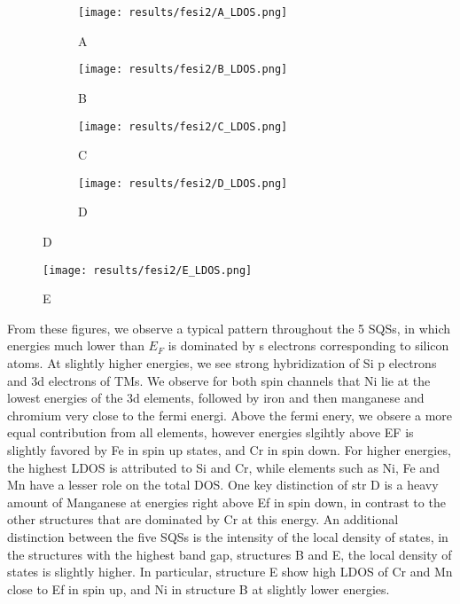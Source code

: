 \begin{figure}[H]
\centering
	\begin{subfigure}{\textwidth}
		\texttt{[image: results/fesi2/A\_LDOS.png]}
		\caption{A}
	\end{subfigure}
	\begin{subfigure}{\textwidth}
		\texttt{[image: results/fesi2/B\_LDOS.png]}
		\caption{B}
	\end{subfigure}
	\begin{subfigure}{\textwidth}
		\texttt{[image: results/fesi2/C\_LDOS.png]}
		\caption{C}
	\end{subfigure}
	\begin{subfigure}{\textwidth}
		\texttt{[image: results/fesi2/D\_LDOS.png]}
		\caption{D}
	\end{subfigure}
\end{figure}		
\begin{figure}[H]
	\centering	
	\texttt{[image: results/fesi2/E\_LDOS.png]}
	\caption{E}
\end{figure}

From these figures, we observe a typical pattern throughout the 5 SQSs, in which energies much lower than $E_F$ is dominated by s electrons corresponding to silicon atoms. At slightly higher energies, we see strong hybridization of Si p electrons and 3d electrons of TMs. We observe for both spin channels that Ni lie at the lowest energies of the 3d elements, followed by iron and then manganese and chromium very close to the fermi energi. Above the fermi enery, we obsere a more equal contribution from all elements, however energies slgihtly above EF is slightly favored by Fe in spin up states, and Cr in spin down. For higher energies, the highest LDOS is attributed to Si and Cr, while elements such as Ni, Fe and Mn have  a lesser role on the total DOS. One key distinction of str D is a heavy amount of Manganese at energies right above Ef in spin down, in contrast to the other structures that are dominated by Cr at this energy. An additional distinction between the five SQSs is the intensity of the local density of states, in the structures with the highest band gap, structures B and E, the local density of states is slightly higher. In particular, structure E show high LDOS of Cr and Mn close to Ef in spin up, and Ni in structure B at slightly lower energies.  

